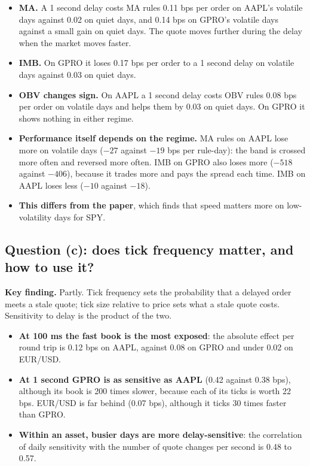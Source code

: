 \documentclass[11pt]{article}
\newcommand{\keyfinding}[1]{%
  \begingroup\setlength{\fboxsep}{9pt}%
  \noindent\colorbox{boxbg}{\parbox{\dimexpr\linewidth-2\fboxsep\relax}{\textbf{\color{accent}Key finding.} #1}}%
  \endgroup\par\vspace{0.5em}}
\begin{document}
\begin{itemize}
  \item \textbf{MA.} A 1 second delay costs MA rules 0.11 bps per order on AAPL's
        volatile days against 0.02 on quiet days, and 0.14 bps on GPRO's volatile
        days against a small gain on quiet days. The quote moves further during
        the delay when the market moves faster.
  \item \textbf{IMB.} On GPRO it loses 0.17 bps per order to a 1 second delay on
        volatile days against 0.03 on quiet days.
  \item \textbf{OBV changes sign.} On AAPL a 1 second delay costs OBV rules
        0.08 bps per order on volatile days and helps them by 0.03 on quiet days.
        On GPRO it shows nothing in either regime.
  \item \textbf{Performance itself depends on the regime.} MA rules on AAPL lose
        more on volatile days ($-27$ against $-19$ bps per rule-day): the band is
        crossed more often and reversed more often. IMB on GPRO also loses more
        ($-518$ against $-406$), because it trades more and pays the spread each
        time. IMB on AAPL loses less ($-10$ against $-18$).
  \item \textbf{This differs from the paper}, which finds that speed matters more
        on low-volatility days for SPY.
\end{itemize}

\subsection{Question (c): does tick frequency matter, and how to use it?}

\keyfinding{Partly. Tick frequency sets the probability that a delayed order meets
a stale quote; tick size relative to price sets what a stale quote costs.
Sensitivity to delay is the product of the two.}

\begin{table}[H]
  \centering
  \small
  \caption{Tick frequency and sensitivity to delay. The absolute effect is the mean
  absolute change in return caused by the delay, per round trip, over the rule
  universe; it measures sensitivity regardless of sign.}
  \label{tab:tick}
  
\end{table}

\begin{itemize}
  \item \textbf{At 100 ms the fast book is the most exposed}: the absolute effect
        per round trip is 0.12 bps on AAPL, against 0.08 on GPRO and under 0.02 on
        EUR/USD.
  \item \textbf{At 1 second GPRO is as sensitive as AAPL} (0.42 against 0.38 bps),
        although its book is 200 times slower, because each of its ticks is worth
        22 bps. EUR/USD is far behind (0.07 bps), although it ticks 30 times
        faster than GPRO.
  \item \textbf{Within an asset, busier days are more delay-sensitive}: the
        correlation of daily sensitivity with the number of quote changes per
        second is 0.48 to 0.57.
\end{itemize}
\end{document}
